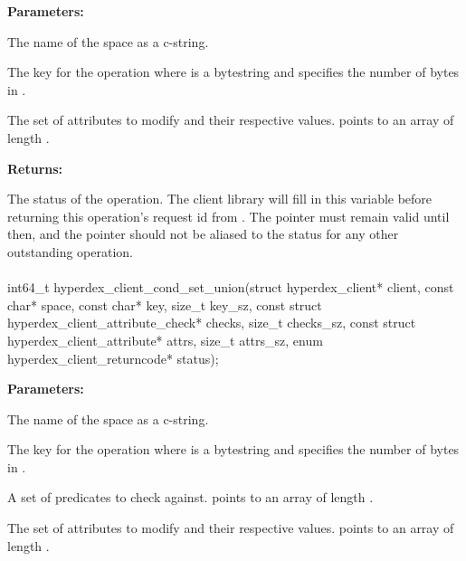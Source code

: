 \noindent\textbf{Parameters:}
\begin{description}[labelindent=\widthof{{\code{attrs}, \code{attrs\_sz}}},leftmargin=*,noitemsep,nolistsep,align=right]
\item[\code{space}] The name of the space as a c-string.
\item[\code{key}, \code{key\_sz}] The key for the operation where  is a bytestring and  specifies the number of bytes in .
\item[\code{attrs}, \code{attrs\_sz}] The set of attributes to modify and their respective values.   points to an array of length .
\end{description}

\noindent\textbf{Returns:}
\begin{description}[labelindent=\widthof{{\code{status}}},leftmargin=*,noitemsep,nolistsep,align=right]
\item[\code{status}] The status of the operation.  The client library will fill in this variable before returning this operation's request id from .  The pointer must remain valid until then, and the pointer should not be aliased to the status for any other outstanding operation.
\end{description}

\paragraph{}
\label{api:c:cond_set_union}
\begin{ccode}
int64_t hyperdex_client_cond_set_union(struct hyperdex_client* client,
                const char* space,
                const char* key, size_t key_sz,
                const struct hyperdex_client_attribute_check* checks, size_t checks_sz,
                const struct hyperdex_client_attribute* attrs, size_t attrs_sz,
                enum hyperdex_client_returncode* status);
\end{ccode}
\funcdesc 

\noindent\textbf{Parameters:}
\begin{description}[labelindent=\widthof{{\code{checks}, \code{checks\_sz}}},leftmargin=*,noitemsep,nolistsep,align=right]
\item[\code{space}] The name of the space as a c-string.
\item[\code{key}, \code{key\_sz}] The key for the operation where  is a bytestring and  specifies the number of bytes in .
\item[\code{checks}, \code{checks\_sz}] A set of predicates to check against.   points to an array of length .
\item[\code{attrs}, \code{attrs\_sz}] The set of attributes to modify and their respective values.   points to an array of length .
\end{description}


